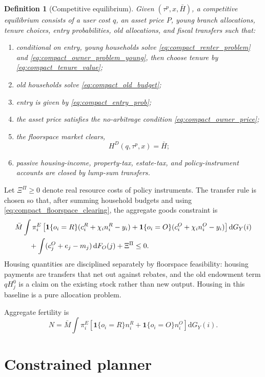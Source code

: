 \documentclass[11pt]{article}
\newtheorem{definition}{Definition}
\newcommand{\dd}{\mathrm d}
\newcommand{\1}{\mathbf 1}
\begin{document}
\begin{definition}[Competitive equilibrium]
Given $(\tau^p,x,\bar H)$, a competitive equilibrium consists of a user cost $q$, an asset price $P$, young branch allocations, tenure choices, entry probabilities, old allocations, and fiscal transfers such that:
\begin{enumerate}
\item conditional on entry, young households solve \eqref{eq:compact_renter_problem} and \eqref{eq:compact_owner_problem_young}, then choose tenure by \eqref{eq:compact_tenure_value};
\item old households solve \eqref{eq:compact_old_budget};
\item entry is given by \eqref{eq:compact_entry_prob};
\item the asset price satisfies the no-arbitrage condition \eqref{eq:compact_owner_price};
\item the floorspace market clears,
\begin{equation}
H^{D}(q,\tau^p,x)=\bar H;
\label{eq:compact_floorspace_clearing}
\end{equation}
\item passive housing-income, property-tax, estate-tax, and policy-instrument accounts are closed by lump-sum transfers.
\end{enumerate}
\end{definition}

Let $\Xi^\Pi\ge0$ denote real resource costs of policy instruments. The transfer rule is chosen so that, after summing household budgets and using \eqref{eq:compact_floorspace_clearing}, the aggregate goods constraint is
\begin{align*}
&\bar M\int
\pi_i^E
\left[
\1\{o_i=R\}(c_i^R+\chi_i n_i^R-y_i)
+
\1\{o_i=O\}(c_i^O+\chi_i n_i^O-y_i)
\right]\dd G_Y(i)
\notag\\
&\qquad
+
\int(c_j^O+e_j-m_j)\,\dd F_O(j)
+\Xi^\Pi
\le0.
\end{align*}
Housing quantities are disciplined separately by floorspace feasibility: housing payments are transfers that net out against rebates, and the old endowment term $q H_j^0$ is a claim on the existing stock rather than new output. Housing in this baseline is a pure allocation problem.

Aggregate fertility is
\[
N
=
\bar M\int \pi_i^E
\left[
\1\{o_i=R\}n_i^R+\1\{o_i=O\}n_i^O
\right]\dd G_Y(i).
\]

\section{Constrained planner}
\end{document}
